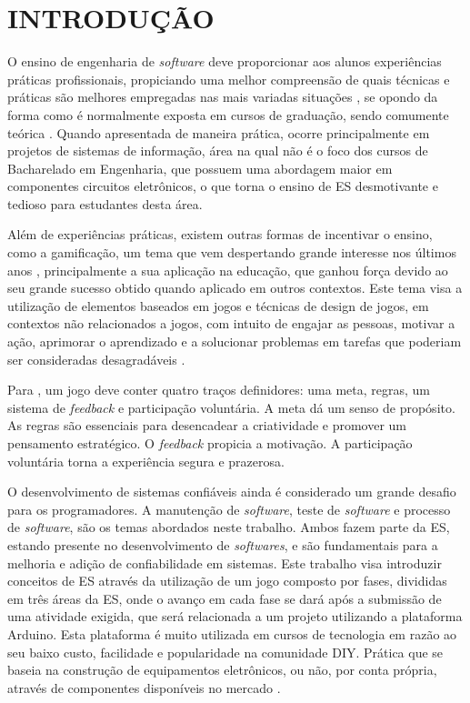 
\chapter{INTRODUÇÃO}
\label{chap:introducao}

O ensino de engenharia de \textit{software} deve proporcionar aos alunos experiências práticas profissionais, propiciando uma melhor compreensão de quais técnicas e práticas são melhores empregadas nas mais variadas situações \cite{Figueiredo2017}, se opondo da forma como é normalmente exposta em cursos de graduação, sendo comumente teórica \cite{Souza2010}. Quando apresentada de maneira prática, ocorre principalmente em projetos de sistemas de informação, área na qual não é o foco dos cursos de Bacharelado em Engenharia, que possuem uma abordagem maior em componentes circuitos eletrônicos, o que torna o ensino de ES desmotivante e tedioso para estudantes desta área.

Além de experiências práticas, existem outras formas de incentivar o ensino, como a gamificação, um tema que vem despertando grande interesse nos últimos anos \cite{Kapp2012}, principalmente a sua aplicação na educação, que ganhou força devido ao seu grande sucesso obtido quando aplicado em outros contextos. Este tema visa a utilização de elementos baseados em jogos e técnicas de design de jogos, em contextos não relacionados a jogos, com intuito de engajar as pessoas, motivar a ação, aprimorar o aprendizado e a solucionar problemas em tarefas que poderiam ser consideradas desagradáveis \cite{Deterding2011, Kapp2012}.

Para , um jogo deve conter quatro traços definidores: uma meta, regras, um sistema de \textit{feedback} e participação voluntária. A meta dá um senso de propósito. As regras são essenciais para desencadear a criatividade e promover um pensamento estratégico. O \textit{feedback} propicia a motivação. A participação voluntária torna a experiência segura e prazerosa.

O desenvolvimento de sistemas confiáveis ainda é considerado um grande desafio para os programadores. A manutenção de \textit{software}, teste de \textit{software} e processo de \textit{software}, são os temas abordados neste trabalho. Ambos fazem parte da ES, estando presente no desenvolvimento de \textit{softwares}, e são fundamentais para a melhoria e adição de confiabilidade em sistemas. Este trabalho visa introduzir conceitos de ES através da utilização de um jogo composto por fases, divididas em três áreas da ES, onde o avanço em cada fase se dará após a submissão de uma atividade exigida, que será relacionada a um projeto utilizando a plataforma Arduino. Esta plataforma é muito utilizada em cursos de tecnologia em razão ao seu baixo custo, facilidade e popularidade na comunidade DIY. Prática que se baseia na construção de equipamentos eletrônicos, ou não, por conta própria, através de componentes disponíveis no mercado \cite{Kuznetsov2010}.



